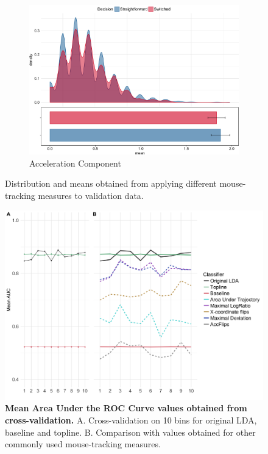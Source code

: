 \documentclass{article}
\begin{document}
\begin{figure}
\begin{subfigure}[b]{0.4\textwidth}
\includegraphics[width=\textwidth]{AC_calibration.png}
\caption{Acceleration Component}
\end{subfigure}

\caption{Distribution and means obtained from applying different mouse-tracking measures to validation data.}
\label{fig:different.measures.validation}

\end{figure}


\begin{figure}
\centering
\includegraphics[width=\textwidth]{auc_calibration_2.png}
\caption{\textbf{Mean Area Under the ROC Curve values obtained from cross-validation.} A. Cross-validation on 10 bins for original LDA, baseline and topline. B. Comparison with values obtained for other commonly used mouse-tracking measures.} \label{DIST:AUC}
\label{DIST:AUC2}
\end{figure}
\end{document}
